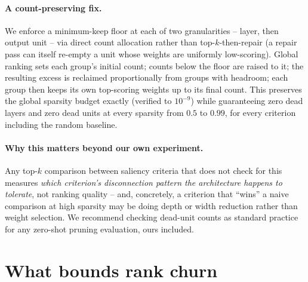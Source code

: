 \documentclass{article}
\begin{document}
\paragraph{A count-preserving fix.} We enforce a minimum-keep floor at each of two
granularities -- layer, then output unit -- via direct count allocation rather than
top-$k$-then-repair (a repair pass can itself re-empty a unit whose weights are uniformly
low-scoring). Global ranking sets each group's initial count; counts below the floor are
raised to it; the resulting excess is reclaimed proportionally from groups with headroom;
each group then keeps its own top-scoring weights up to its final count. This preserves the
global sparsity budget exactly (verified to $10^{-9}$) while guaranteeing zero dead layers
and zero dead units at every sparsity from $0.5$ to $0.99$, for every criterion including
the random baseline.

\paragraph{Why this matters beyond our own experiment.} Any top-$k$ comparison between
saliency criteria that does not check for this measures \emph{which criterion's
disconnection pattern the architecture happens to tolerate}, not ranking quality -- and,
concretely, a criterion that ``wins'' a naive comparison at high sparsity may be doing
depth or width reduction rather than weight selection. We recommend checking dead-unit
counts as standard practice for any zero-shot pruning evaluation, ours included.

\section{What bounds rank churn}
\label{sec:theory}
\end{document}
